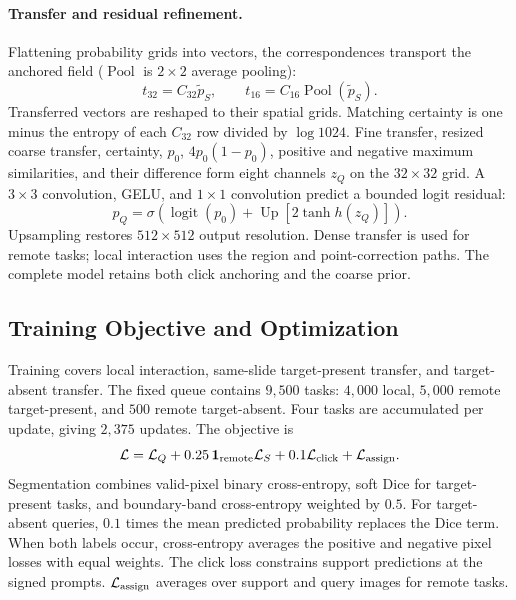 \paragraph{Transfer and residual refinement.}
Flattening probability grids into vectors, the correspondences transport the anchored field ($\operatorname{Pool}$ is $2\times2$ average pooling):
\begin{equation}
 t_{32}=C_{32}\widetilde p_S,\qquad
 t_{16}=C_{16}\operatorname{Pool}(\widetilde p_S).
\end{equation}
Transferred vectors are reshaped to their spatial grids. Matching certainty is one minus the entropy of each $C_{32}$ row divided by $\log 1024$. Fine transfer, resized coarse transfer, certainty, $p_0$, $4p_0(1-p_0)$, positive and negative maximum similarities, and their difference form eight channels $z_Q$ on the $32\times32$ grid. A $3\times3$ convolution, GELU, and $1\times1$ convolution predict a bounded logit residual:
\begin{equation}
 p_Q=\sigma\!\left(\operatorname{logit}(p_0)
                +\operatorname{Up}[2\tanh h(z_Q)]\right).
\label{eq:residual}
\end{equation}
Upsampling restores $512\times512$ output resolution. Dense transfer is used for remote tasks; local interaction uses the region and point-correction paths. The complete model retains both click anchoring and the coarse prior.

\subsection{Training Objective and Optimization}
\label{sec:training}
Training covers local interaction, same-slide target-present transfer, and target-absent transfer. The fixed queue contains $9{,}500$ tasks: $4{,}000$ local, $5{,}000$ remote target-present, and $500$ remote target-absent. Four tasks are accumulated per update, giving $2{,}375$ updates. The objective is
\begin{equation}
 \mathcal L=\mathcal L_Q+0.25\,\mathbf{1}_{\rm remote}\mathcal L_S
                  +0.1\mathcal L_{\rm click}+\mathcal L_{\rm assign}.
\end{equation}
Segmentation combines valid-pixel binary cross-entropy, soft Dice for target-present tasks, and boundary-band cross-entropy weighted by $0.5$. For target-absent queries, $0.1$ times the mean predicted probability replaces the Dice term. When both labels occur, cross-entropy averages the positive and negative pixel losses with equal weights. The click loss constrains support predictions at the signed prompts. $\mathcal L_{\rm assign}$ averages over support and query images for remote tasks.

